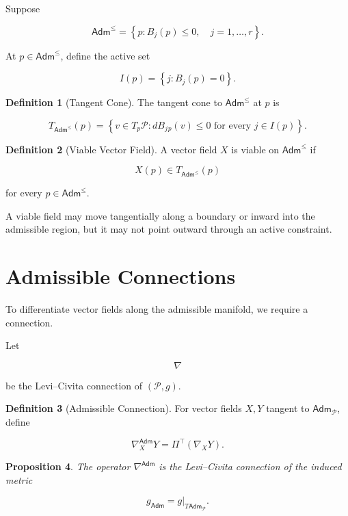 \documentclass[11pt,oneside]{book}
\numberwithin{equation}{chapter}
\theoremstyle{definition}
\newtheorem{definition}{Definition}[chapter]
\theoremstyle{plain}
\newtheorem{proposition}[definition]{Proposition}
\newcommand{\Adm}{\mathsf{Adm}}
\begin{document}
Suppose

\[
\Adm^{\leq}
=
\left\{
p:
B_j(p)\leq 0,
\quad
j=1,\ldots,r
\right\}.
\]

At \(p\in\Adm^{\leq}\), define the active set

\[
I(p)
=
\left\{
j:
B_j(p)=0
\right\}.
\]

\begin{definition}[Tangent Cone]

The tangent cone to \(\Adm^{\leq}\) at \(p\) is

\[
T_{\Adm^{\leq}}(p)
=
\left\{
v\in T_p\mathcal P:
dB_j{}_p(v)\leq 0
\text{ for every }j\in I(p)
\right\}.
\]

\end{definition}

\begin{definition}[Viable Vector Field]

A vector field \(X\) is viable on \(\Adm^{\leq}\) if

\[
X(p)
\in
T_{\Adm^{\leq}}(p)
\]

for every \(p\in\Adm^{\leq}\).

\end{definition}

A viable field may move tangentially along a boundary or inward into the
admissible region, but it may not point outward through an active
constraint.

\section{Admissible Connections}

To differentiate vector fields along the admissible manifold, we require a
connection.

Let

\[
\nabla
\]

be the Levi--Civita connection of \((\mathcal P,g)\).

\begin{definition}[Admissible Connection]

For vector fields \(X,Y\) tangent to \(\Adm_{\mathcal P}\), define

\[
\nabla^{\Adm}_X Y
=
\Pi^{\top}
\left(
\nabla_XY
\right).
\]

\end{definition}

\begin{proposition}

The operator \(\nabla^{\Adm}\) is the Levi--Civita connection of the induced
metric

\[
g_{\Adm}
=
g|_{T\Adm_{\mathcal P}}.
\]

\end{proposition}
\end{document}
